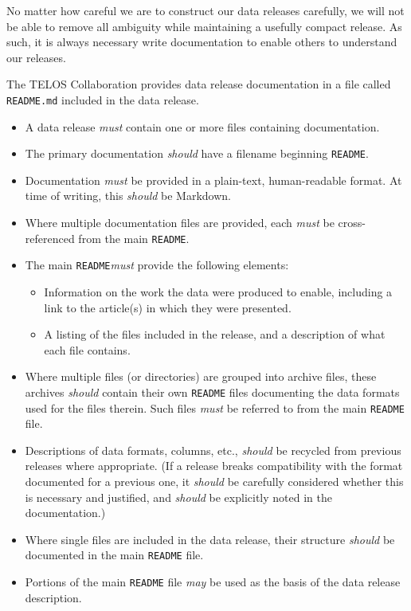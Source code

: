 \documentclass{article}
\newcommand\rfcword[1]{\emph{#1}\xspace}
\newcommand\must{\rfcword{must}}
\newcommand\should{\rfcword{should}}
\newcommand\may{\rfcword{may}}
\newcommand\filename[1]{\texttt{#1}\xspace}
\newcommand\readme{\filename{README}\xspace}
\begin{document}
No matter how careful we are to construct our data releases carefully,
we will not be able to remove all ambiguity while maintaining a usefully compact release.
As such,
it is always necessary write documentation to enable others to understand our releases.

The TELOS Collaboration provides data release documentation in a file called \filename{README.md}
included in the data release.

\begin{itemize}
  \item
        A data release \must contain one or more files containing documentation.
  \item
        The primary documentation \should have a filename beginning \readme.
  \item
        Documentation \must be provided in a plain-text, human-readable format.
        At time of writing,
        this \should be Markdown.
  \item
        Where multiple documentation files are provided,
        each \must be cross-referenced from the main \readme.
  \item
        The main \readme \must provide the following elements:
        \begin{itemize}
          \item
                Information on the work the data were produced to enable,
                including a link to the article(s) in which they were presented.
          \item
                A listing of the files included in the release,
                and a description of what each file contains.
        \end{itemize}
  \item
        Where multiple files (or directories) are grouped into archive files,
        these archives \should contain their own \readme files
        documenting the data formats used for the files therein.
        Such files \must be referred to from the main \readme file.
  \item
        Descriptions of data formats, columns, etc.,
        \should be recycled from previous releases where appropriate.
        (If a release breaks compatibility with the format documented for a previous one,
        it \should be carefully considered whether this is necessary and justified,
        and \should be explicitly noted in the documentation.)
  \item
        Where single files are included in the data release,
        their structure \should be documented in the main \readme file.
  \item
        Portions of the main \readme file \may be used as
        the basis of the data release description.
\end{itemize}
\end{document}
